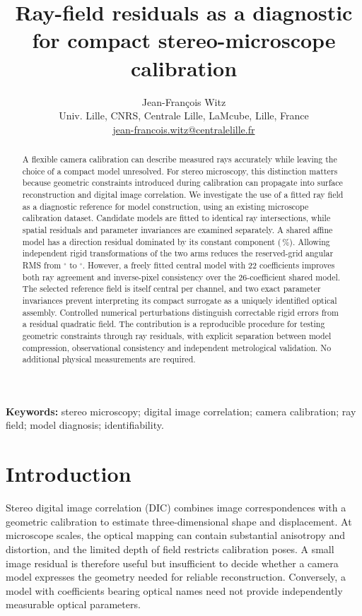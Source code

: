 \documentclass[10pt,a4paper]{article}
\title{Ray-field residuals as a diagnostic for compact stereo-microscope calibration}
\author{Jean-Fran\c{c}ois Witz\\[3pt]\small Univ. Lille, CNRS, Centrale Lille, LaMcube, Lille, France\\\small\href{mailto:jean-francois.witz@centralelille.fr}{jean-francois.witz@centralelille.fr}}
\date{}
\begin{document}
\maketitle
\begin{abstract}
A flexible camera calibration can describe measured rays accurately while leaving the choice of a compact model unresolved. For stereo microscopy, this distinction matters because geometric constraints introduced during calibration can propagate into surface reconstruction and digital image correlation. We investigate the use of a fitted ray field as a diagnostic reference for model construction, using an existing microscope calibration dataset. Candidate models are fitted to identical ray intersections, while spatial residuals and parameter invariances are examined separately. A shared affine model has a direction residual dominated by its constant component (\PistonPct\,\%). Allowing independent rigid transformations of the two arms reduces the reserved-grid angular RMS from \SharedAngle$^\circ$ to \AlignedAngle$^\circ$. However, a freely fitted central model with 22 coefficients improves both ray agreement and inverse-pixel consistency over the 26-coefficient shared model. The selected reference field is itself central per channel, and two exact parameter invariances prevent interpreting its compact surrogate as a uniquely identified optical assembly. Controlled numerical perturbations distinguish correctable rigid errors from a residual quadratic field. The contribution is a reproducible procedure for testing geometric constraints through ray residuals, with explicit separation between model compression, observational consistency and independent metrological validation. No additional physical measurements are required.
\end{abstract}
\noindent\textbf{Keywords:} stereo microscopy; digital image correlation; camera calibration; ray field; model diagnosis; identifiability.

\section{Introduction}\label{sec:intro}
Stereo digital image correlation (DIC) combines image correspondences with a geometric calibration to estimate three-dimensional shape and displacement. At microscope scales, the optical mapping can contain substantial anisotropy and distortion, and the limited depth of field restricts calibration poses. A small image residual is therefore useful but insufficient to decide whether a camera model expresses the geometry needed for reliable reconstruction. Conversely, a model with coefficients bearing optical names need not provide independently measurable optical parameters.
\end{document}
